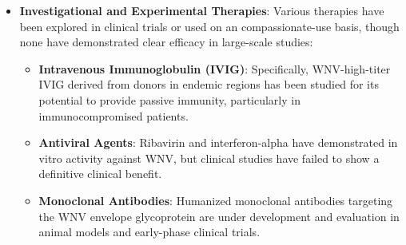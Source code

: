 \begin{itemize}
\begin{itemize}
    \end{itemize}
    \item \textbf{Investigational and Experimental Therapies}: Various therapies have been explored in clinical trials or used on an compassionate-use basis, though none have demonstrated clear efficacy in large-scale studies:
    \begin{itemize}
        \item \textbf{Intravenous Immunoglobulin (IVIG)}: Specifically, WNV-high-titer IVIG derived from donors in endemic regions has been studied for its potential to provide passive immunity, particularly in immunocompromised patients.
        \item \textbf{Antiviral Agents}: Ribavirin and interferon-alpha have demonstrated in vitro activity against WNV, but clinical studies have failed to show a definitive clinical benefit.
        \item \textbf{Monoclonal Antibodies}: Humanized monoclonal antibodies targeting the WNV envelope glycoprotein are under development and evaluation in animal models and early-phase clinical trials.
    \end{itemize}
\end{itemize}

